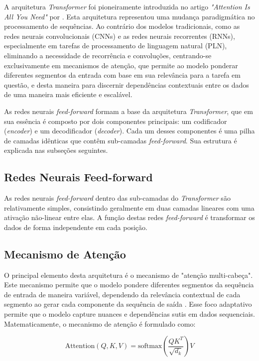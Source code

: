A arquitetura \textit{Transformer} foi pioneiramente introduzida no artigo \textit{"Attention Is All You Need"} por \cite{vaswani2017attention}. Esta arquitetura representou uma mudança paradigmática no processamento de sequências. Ao contrário dos modelos tradicionais, como as redes neurais convolucionais (CNNs) e as redes neurais recorrentes (RNNs), especialmente em tarefas de processamento de linguagem natural (PLN),  eliminando a necessidade de recorrência e convoluções, centrando-se exclusivamente em mecanismos de atenção, que permite ao modelo ponderar diferentes segmentos da entrada com base em sua relevância para a tarefa em questão, e desta maneira para discernir dependências contextuais entre os dados de uma maneira mais eficiente e escalável. 


As redes neurais \textit{feed-forward} formam a base da arquitetura \textit{Transformer}, que em sua essência é composto por dois componentes principais: um codificador (\textit{encoder}) e um decodificador (\textit{decoder}). Cada um desses componentes é uma pilha de camadas idênticas que contêm sub-camadas \textit{feed-forward}. Sua estrutura é explicada nas subseções seguintes.

\subsection{Redes Neurais Feed-forward}
As redes neurais \textit{feed-forward} dentro das sub-camadas do \textit{Transformer} são relativamente simples, consistindo geralmente em duas camadas lineares com uma ativação não-linear entre elas. A função destas redes \textit{feed-forward} é transformar os dados de forma independente em cada posição.

\subsection{Mecanismo de Atenção}
O principal elemento desta arquitetura é o mecanismo de "atenção multi-cabeça". Este mecanismo permite que o modelo pondere diferentes segmentos da sequência de entrada de maneira variável, dependendo da relevância contextual de cada segmento ao gerar cada componente da sequência de saída \cite{vaswani2017attention}. Esse foco adaptativo permite que o modelo capture nuances e dependências sutis em dados sequenciais. Matematicamente, o mecanismo de atenção é formulado como:

\[
\text{Attention}(Q, K, V) = \text{softmax}\left(\frac{QK^T}{\sqrt{d_k}}\right) V
\]

